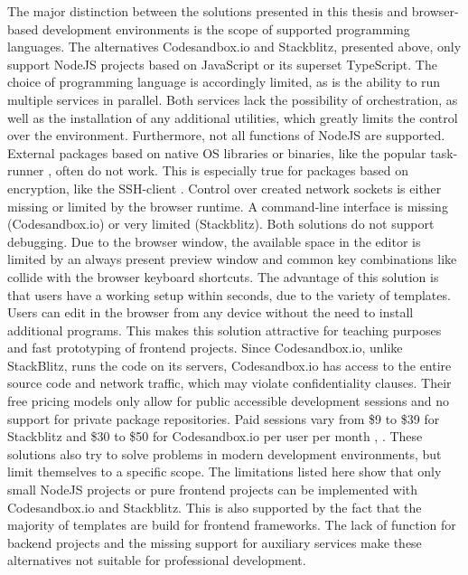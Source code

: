 The major distinction between the solutions presented in this thesis and browser-based development environments is the scope of supported programming languages. The alternatives Codesandbox.io and Stackblitz, presented above, only support NodeJS projects based on JavaScript or its superset TypeScript. The choice of programming language is accordingly limited, as is the ability to run multiple services in parallel. Both services lack the possibility of orchestration, as well as the installation of any additional utilities, which greatly limits the control over the environment. \newline
Furthermore, not all functions of NodeJS are supported. External packages based on native \acl{OS} libraries or binaries, like the popular task-runner , often do not work. This is especially true for packages based on encryption, like the \ac{SSH}-client . Control over created network sockets is either missing or limited by the browser runtime. A command-line interface is missing (Codesandbox.io) or very limited (Stackblitz). Both solutions do not support debugging. Due to the browser window, the available space in the editor is limited by an always present preview window and common key combinations like  collide with the browser keyboard shortcuts.\newline
The advantage of this solution is that users have a working setup within seconds, due to the variety of templates. Users can edit in the browser from any device without the need to install additional programs. This makes this solution attractive for teaching purposes and fast prototyping of frontend projects. Since Codesandbox.io, unlike StackBlitz, runs the code on its servers, Codesandbox.io has access to the entire source code and network traffic, which may violate confidentiality clauses. Their free pricing models only allow for public accessible development sessions and no support for private package repositories. Paid sessions vary from \$9 to \$39 for Stackblitz and \$30 to \$50 for Codesandbox.io per user per month \cite{stackblitz}, \cite{codesandbox}. \newline
These solutions also try to solve problems in modern development environments, but limit themselves to a specific scope. The limitations listed here show that only small NodeJS projects or pure frontend projects can be implemented with Codesandbox.io and Stackblitz. This is also supported by the fact that the majority of templates are build for frontend frameworks. The lack of function for backend projects and the missing support for auxiliary services make these alternatives not suitable for professional development.

